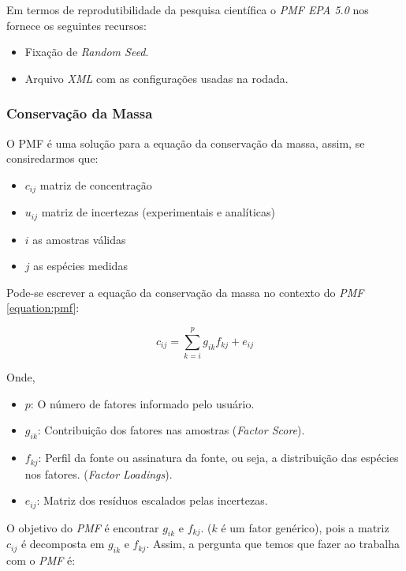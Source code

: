 Em termos de reprodutibilidade da pesquisa científica o \textit{PMF EPA 5.0} 
nos fornece os seguintes recursos:

\begin{itemize}
  \item Fixação de \textit{Random Seed}.%
  \item Arquivo \textit{XML} com as configurações usadas na rodada. 
\end{itemize} 

\subsubsection{Conservação da Massa}
O PMF é uma solução para a equação da conservação da massa, assim, se 
consiredarmos que:
\begin{itemize}
  \item $c_{ij}$ matriz de concentração
  \item $u_{ij}$ matriz de incertezas (experimentais e analíticas)
  \item $i$ as amostras válidas
  \item $j$ as espécies medidas
\end{itemize}

Pode-se escrever a equação da conservação da massa no 
contexto do \textit{PMF} \ref{equation:pmf}: 

\begin{equation}
  c_{ij} = \sum_{k=i}^p g_{ik}f_{kj} + e_{ij}
  \label{equation:pmf}
\end{equation}

Onde,
\begin{itemize}
  \item $p$: O número de fatores informado pelo usuário.
  \item $g_{ik}$: Contribuição dos fatores nas amostras (\textit{Factor Score}).
  \item $f_{kj}$: Perfil da fonte ou assinatura da fonte, ou seja, 
        a distribuição das espécies nos fatores. (\textit{Factor Loadings}).
  \item $e_{ij}$: Matriz dos resíduos escalados pelas incertezas.
\end{itemize}

O objetivo do \textit{PMF} é encontrar $g_{ik}$ e $f_{kj}$. 
($k$ é um fator genérico), pois a matriz $c_{ij}$ é decomposta em 
$g_{ik}$ e $f_{kj}$. Assim, a pergunta que temos que fazer ao trabalha com 
o \textit{PMF} é: 

